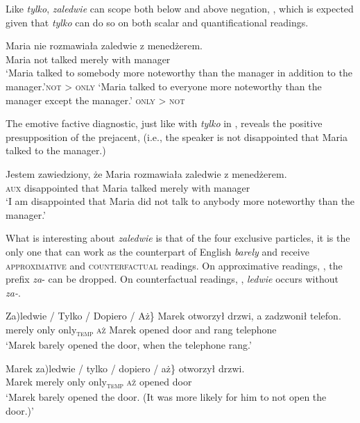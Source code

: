 \documentclass[output=paper,colorlinks,citecolor=brown]{langscibook}
\begin{document}
\noindent Like \textit{tylko}, \textit{zaledwie} can scope both below and above negation, , which is expected given that \textit{tylko} can do so on both scalar and quantificational readings.

\ea\label{ex:tom:39}
\gll Maria nie rozmawiała zaledwie z menedżerem.\\
Maria not talked merely with manager\\
\ea 
‘Maria talked to somebody more noteworthy than the manager in addition to the manager.’\hfill \textsc{not} > \textsc{only}
\ex ‘Maria talked to everyone more noteworthy than the manager except the manager.’ \hfill \textsc{only} > \textsc{not}
\z 
\z 

\noindent The emotive factive diagnostic, just like with \textit{tylko} in , reveals the positive presupposition of the prejacent,  (i.e., the speaker is not disappointed that Maria talked to the manager.)

\ea\label{ex:tom:40}
\gll Jestem zawiedziony, że Maria rozmawiała zaledwie z menedżerem.\\
 \textsc{aux} disappointed that Maria talked merely with manager\\
\glt `I am disappointed that Maria did not talk to anybody more noteworthy than the manager.’
\z 

\noindent What is interesting about \textit{zaledwie} is that of the four exclusive particles, it is the only one that can work as the counterpart of %
English \textit{barely} and receive \textsc{approximative}  \citep{roberts11} and \textsc{counterfactual}  \citep{toosarvandani10} readings. On approximative readings, , the prefix \textit{za}{}- can be dropped. On counterfactual readings, , \textit{ledwie} occurs without \textit{za-}.

\ea\label{ex:tom:41}
\gll \minsp{\{(} Za)ledwie / \minsp{\#} Tylko / \minsp{\#} Dopiero / \minsp{\#} Aż\} Marek otworzył  drzwi, a zadzwonił telefon.\\
{} merely {} {} only {} {} only\textsubscript{\textsc{temp}} {} {} \textsc{aż} Marek opened door and rang telephone\\
\glt `Marek barely opened the door, when the telephone rang.’
\z 

\ea\label{ex:tom:42}
\gll Marek \minsp{\{(*} za)ledwie / \minsp{\#} tylko / \minsp{\#} dopiero / \minsp{\#} aż\} otworzył drzwi.\\
Marek {} merely {} {} only {} {} only\textsubscript{\textsc{temp}} {} {} \textsc{aż} opened door \\     
\glt `Marek barely opened the door. (It was more likely for him to not open the door.)'
\z 
\end{document}
